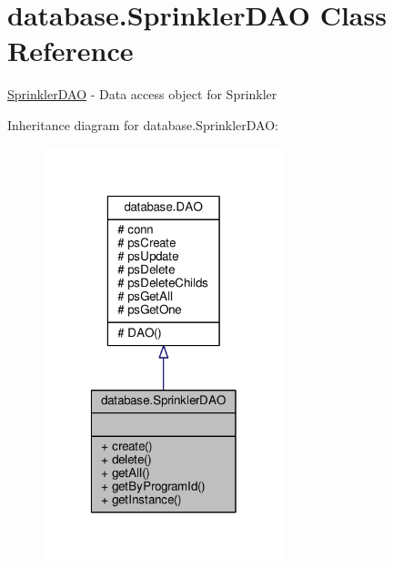 \hypertarget{classdatabase_1_1SprinklerDAO}{\section{database.\-Sprinkler\-D\-A\-O Class Reference}
\label{classdatabase_1_1SprinklerDAO}
}


\hyperlink{classdatabase_1_1SprinklerDAO}{Sprinkler\-D\-A\-O} -\/ Data access object for Sprinkler  




Inheritance diagram for database.\-Sprinkler\-D\-A\-O\-:\nopagebreak
\begin{figure}[H]
\begin{center}
\leavevmode
\includegraphics[width=198pt]{classdatabase_1_1SprinklerDAO__inherit__graph}
\end{center}
\end{figure}


